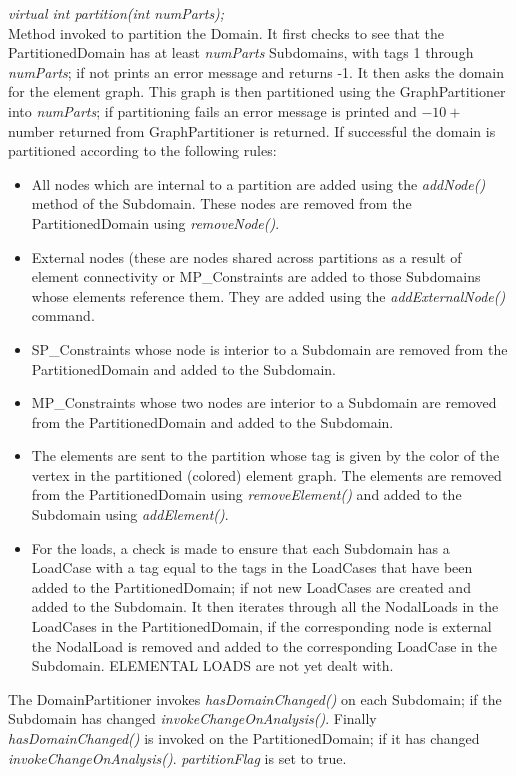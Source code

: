 {\em virtual int partition(int numParts);}\\
Method invoked to partition the Domain. It first checks to see that
the PartitionedDomain has at least {\em numParts} Subdomains, with tags
1 through {\em numParts}; if not prints an error message and returns -1. 
It then asks the domain for the element graph. This graph is then partitioned 
using the GraphPartitioner into {\em numParts}; if partitioning fails an error 
message is printed and  $-10 +$ number returned from GraphPartitioner is
returned. If successful the domain is partitioned according to the
following rules: \begin{itemize}
\item All nodes which are internal to a partition are added using the
{\em addNode()} method of the Subdomain. These nodes are removed from
the PartitionedDomain using {\em removeNode()}. 
\item External nodes (these are nodes shared across partitions as a
result of element connectivity or MP\_Constraints are added to those
Subdomains whose elements reference them. They are added using the
{\em addExternalNode()} command. 
\item SP\_Constraints whose node is interior to a Subdomain are removed
from the PartitionedDomain and added to the Subdomain. 
\item MP\_Constraints whose two nodes are interior to a Subdomain are
removed from the PartitionedDomain and added to the Subdomain.
\item The elements are sent to the partition whose tag is given by the
color of the vertex in the partitioned (colored) element graph. The
elements are removed from the PartitionedDomain using {\em
removeElement()} and added to the Subdomain using {\em addElement()}.
\item For the loads, a check is made to ensure that each Subdomain has
a LoadCase with a tag equal to the tags in the LoadCases that have
been added to the PartitionedDomain; if not new LoadCases are created
and added to the Subdomain. It then iterates through all the
NodalLoads in the LoadCases in the PartitionedDomain, if the
corresponding node is external the NodalLoad is removed and added to
the corresponding LoadCase in the Subdomain. ELEMENTAL LOADS are not
yet dealt with. 
\end{itemize}

The DomainPartitioner invokes {\em hasDomainChanged()} on each Subdomain; if the Subdomain 
has changed {\em invokeChangeOnAnalysis()}. Finally {\em
hasDomainChanged()} is invoked on the PartitionedDomain; if it has
changed {\em invokeChangeOnAnalysis()}. {\em partitionFlag} is set to
true. \\ 


